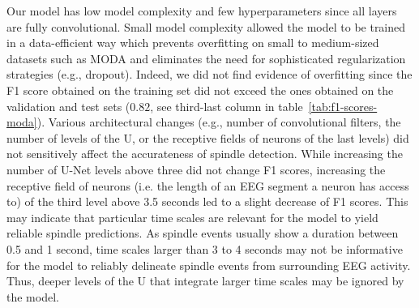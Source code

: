 \documentclass[fleqn,twocolumn,10pt]{wlscirep}
\begin{document}
Our model has low model complexity and few hyperparameters since all layers are
fully convolutional.
Small model complexity allowed the model to be trained in a data-efficient way
which prevents overfitting on small to medium-sized datasets such as MODA and
eliminates the need for sophisticated regularization strategies (e.g., dropout).
Indeed, we did not find evidence of overfitting since the F1 score obtained on
the training set did not exceed the ones obtained on the validation and test
sets ($0.82$, see third-last column in table~\ref{tab:f1-scores-moda}).
Various architectural changes (e.g., number of convolutional filters, the number
of levels of the U, or the receptive fields of neurons of the last levels) did
not sensitively affect the accurateness of spindle detection.
While increasing the number of U-Net levels above three did not change F1
scores, increasing the receptive field of neurons (i.e. the length of an EEG
segment a neuron has access to) of the third level above 3.5 seconds led to a
slight decrease of F1 scores.
This may indicate that particular time scales are relevant for the model to yield
reliable spindle predictions.
As spindle events usually show a duration between 0.5 and 1
second\cite{Lacourse2020}, time scales larger than 3 to 4 seconds may not be
informative for the model to reliably delineate spindle events from surrounding
EEG activity.
Thus, deeper levels of the U that integrate larger time scales may be ignored by
the model.
\end{document}
